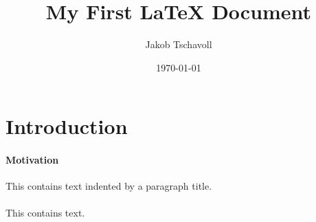 \documentclass[a4paper]{article}
\begin{document}
	\title{\textbf{My First LaTeX Document}}
	\author{Jakob Tschavoll}
	\date{\today}
	\maketitle
	
	\section{Introduction}
	
	\paragraph{Motivation}
	This contains text indented by a paragraph title.
	
	\paragraph{}
	This contains text.
	
\end{document}
